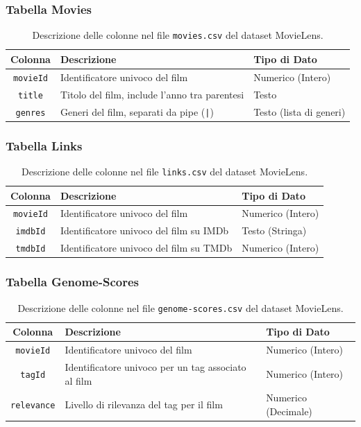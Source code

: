 \documentclass[a4paper,12pt]{article}
\begin{document}
        \subsubsection{Tabella Movies} 
		\begin{table}[h!]
			\centering
				\begin{tabular}{|c|l|l|}
					\hline
					\textbf{Colonna} & \textbf{Descrizione} & \textbf{Tipo di Dato} \\ \hline
					\texttt{movieId} & Identificatore univoco del film & Numerico (Intero) \\ \hline
					\texttt{title} & Titolo del film, include l'anno tra parentesi & Testo \\ \hline
					\texttt{genres} & Generi del film, separati da pipe (\texttt{|}) & Testo (lista di generi) \\ \hline
				\end{tabular}
			\caption{Descrizione delle colonne nel file \texttt{movies.csv} del dataset MovieLens.}
		\end{table}

        \subsubsection{Tabella Links}
		\begin{table}[h!]
			\centering
				\begin{tabular}{|c|l|l|}
					\hline
					\textbf{Colonna} & \textbf{Descrizione} & \textbf{Tipo di Dato} \\ \hline
					\texttt{movieId} & Identificatore univoco del film & Numerico (Intero) \\ \hline
					\texttt{imdbId} & Identificatore univoco del film su IMDb & Testo (Stringa) \\ \hline
					\texttt{tmdbId} & Identificatore univoco del film su TMDb & Numerico (Intero) \\ \hline
				\end{tabular}
			\caption{Descrizione delle colonne nel file \texttt{links.csv} del dataset MovieLens.}
		\end{table}

        \subsubsection{Tabella Genome-Scores}
			\begin{table}[h!]
				\centering
					\begin{tabular}{|c|l|l|}
						\hline
						\textbf{Colonna} & \textbf{Descrizione} & \textbf{Tipo di Dato} \\ \hline
						\texttt{movieId} & Identificatore univoco del film & Numerico (Intero) \\ \hline
						\texttt{tagId} & Identificatore univoco per un tag associato al film & Numerico (Intero) \\ \hline
						\texttt{relevance} & Livello di rilevanza del tag per il film & Numerico (Decimale) \\ \hline
					\end{tabular}
				\caption{Descrizione delle colonne nel file \texttt{genome-scores.csv} del dataset MovieLens.}
			\end{table}
\end{document}
